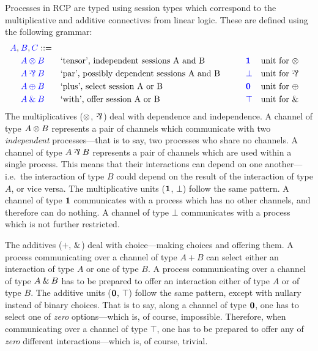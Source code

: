 \documentclass[a4paper,UKenglish]{lipics-v2016}
\begin{document}
Processes in RCP are typed using session types which correspond to the
multiplicative and additive connectives from linear logic. These are defined
using the following grammar:
\[
  \begin{aligned}
    \blue{A},\:&\blue{B},\blue{C} ::=\\
    &       \tm{A \tens B} &&\text{`tensor', independent sessions A and B}
    &\qquad&\tm{\one}      &&\text{unit for \tens}\\
    &       \tm{A \parr B} &&\text{`par', possibly dependent sessions A and B}
    &\qquad&\tm{\bot}      &&\text{unit for \parr}\\
    &       \tm{A \plus B} &&\text{`plus', select session A or B}
    &\qquad&\tm{\nil}      &&\text{unit for \plus}\\
    &       \tm{A \with B} &&\text{`with', offer session A or B}
    &\qquad&\tm{\top}      &&\text{unit for \with}
  \end{aligned}
\]
The multiplicatives ($\otimes$, $\parr$) deal with dependence and independence.
A channel of type $A \otimes B$ represents a pair of channels which communicate
with two \emph{independent} processes---that is to say, two processes who share
no channels.
A channel of type $A \parr B$ represents a pair of channels which are used
within a single process. This means that their interactions can depend on one
another---i.e.\ the interaction of type $B$ could depend on the result of the
interaction of type $A$, or vice versa.
The multiplicative units ($\mathbf{1}$, $\bot$) follow the same pattern.
A channel of type $\mathbf{1}$ communicates with a process which has no other
channels, and therefore can do nothing.
A channel of type $\bot$ communicates with a process which is not further
restricted.

The additives ($\plus$, $\mathbin{\text{\&}}$) deal with choice---making choices and offering
them.
A process communicating over a channel of type $A \plus B$ can select either an
interaction of type $A$ or one of type $B$.
A process communicating over a channel of type $A \mathbin{\text{\&}} B$ has to be prepared to
offer an interaction either of type $A$ or of type $B$.
The additive units ($\mathbf{0}$, $\top$) follow the same pattern, except with nullary
instead of binary choices. That is to say, along a channel of type $\mathbf{0}$, one
has to select one of \emph{zero} options---which is, of course, impossible.
Therefore, when communicating over a channel of type $\top$, one has to be
prepared to offer any of \emph{zero} different interactions---which is, of
course, trivial.
\end{document}
